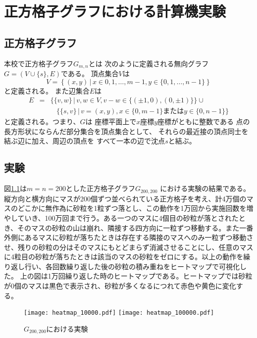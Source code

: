 \documentclass[lualatex,12pt,ja=standard]{bxjsreport}
\begin{document}
\chapter{正方格子グラフにおける計算機実験}

\section{正方格子グラフ}
本校で正方格子グラフ$G_{m,n}$とは
次のように定義される無向グラフ$G=(V\cup\{s\},E)$である。
頂点集合$V$は
\[
 V = \left\{(x,y)\,|\, x\in {0,1,\ldots,m-1}, y\in \{0,1,\ldots,n-1\}\right\}
\]
と定義される。
また辺集合$E$は
\begin{eqnarray*}
 E & = & \{\{v,w\}\,|\, v,w\in V, v-w \in\{(\pm 1,0), (0,\pm 1)\}\} \cup \\
 & & ~~~~ \{\{s,v\}\,|\, v=(x,y), x\in \{0,m-1\}または y\in\{0,n-1\}\}
\end{eqnarray*}
と定義される。つまり、$G$は
座標平面上で$x$座標$y$座標がともに整数である
点の長方形状にならんだ部分集合を頂点集合として、
それらの最近接の頂点同士を結ぶ辺に加え、周辺の頂点を
すべて一本の辺で沈点$s$と結ぶ。

\section{実験}
図\ref{fig:experiment1}は$m=n=200$とした正方格子グラフ$G_{200,200}$
における実験の結果である。
縦方向と横方向にマスが200個ずつ並べられている正方格子を考え、計4万個のマスのどこかに無作為に砂粒を1粒ずつ落とし、この動作を1万回から実施回数を増やしていき、100万回まで行う。ある一つのマスに4個目の砂粒が落とされたとき、そのマスの砂粒の山は崩れ、隣接する四方向に一粒ずつ移動する。また一番外側にあるマスに砂粒が落ちたときは存在する隣接のマスへのみ一粒ずつ移動させ、残りの砂粒の分はそのマスにもとどまらず消滅させることにし、任意のマスに4粒目の砂粒が落ちたときは該当のマスの砂粒をゼロにする。以上の動作を繰り返し行い、各回数繰り返した後の砂粒の積み重ねをヒートマップで可視化した。
上の図は1万回繰り返した時のヒートマップである。ヒートマップでは砂粒が0個のマスは黒色で表示され、砂粒が多くなるにつれて赤色や黄色に変化する。

\begin{figure}[H]
 \begin{center}
  \texttt{[image: heatmap\_10000.pdf]}
  \texttt{[image: heatmap\_100000.pdf]}
  \caption{$G_{200,200}$における実験}
  \label{fig:experiment1}
 \end{center}
\end{figure}
\end{document}
